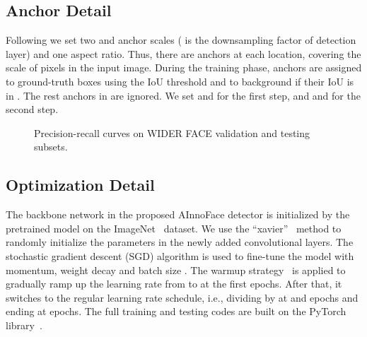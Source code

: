 \documentclass{article} \usepackage{nips13submit_e,times}
\begin{document}
\subsection{Anchor Detail}
Following \cite{DBLP:journals/corr/abs-1809-02693} we set two  and  anchor scales ( is the downsampling factor of detection layer) and one  aspect ratio. Thus, there are  anchors at each location, covering the scale of  pixels in the  input image. During the training phase, anchors are assigned to ground-truth boxes using the  IoU threshold and to background if their IoU is in . The rest anchors in  are ignored. We set  and  for the first step, and  and  for the second step.

\begin{figure}[!h]
\centering
{}
\caption{Precision-recall curves on WIDER FACE validation and testing subsets.}
\label{fig:wider-face-ap}
\end{figure}


\subsection{Optimization Detail}
The backbone network in the proposed AInnoFace detector is initialized by the pretrained model on the ImageNet~\cite{DBLP:journals/ijcv/RussakovskyDSKS15} dataset. We use the ``xavier''~\cite{DBLP:journals/jmlr/GlorotB10} method to randomly initialize the parameters in the newly added convolutional layers. The stochastic gradient descent (SGD) algorithm is used to fine-tune the model with  momentum,  weight decay and batch size . The warmup strategy~\cite{DBLP:journals/corr/GoyalDGNWKTJH17} is applied to gradually ramp up the learning rate from  to  at the first  epochs. After that, it switches to the regular learning rate schedule, i.e., dividing by  at  and  epochs and ending at  epochs. The full training and testing codes are built on the PyTorch library~\cite{paszke2017pytorch}.
\end{document}
